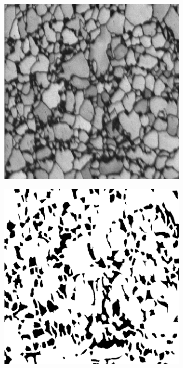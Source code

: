 \documentclass{article}
\begin{document}
\begin{figure}[h!]
     \centering
     \begin{subfigure}[b]{0.3\textwidth}
         \centering
         \includegraphics[width=\textwidth]{Micro1_600.png}
         \caption{}
         \label{fig:Micro1_600}
     \end{subfigure}
     \hfill
     \begin{subfigure}[b]{0.3\textwidth}
         \centering
         \includegraphics[width=\textwidth]{Micro2_600.png}

\end{subfigure}
\end{figure}
\end{document}
